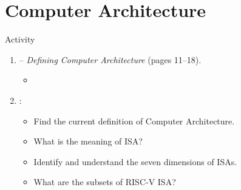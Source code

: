 \section{Computer Architecture}

\begin{frame}[t]{Activity}
\begin{enumerate}
  \item {}  -- 
        \emph{Defining Computer Architecture} (pages 11--18).
    \begin{itemize}
      \item \credithennessy
    \end{itemize}

  \item {}:
    \begin{itemize}
      \item Find the current definition of Computer Architecture.
      \item What is the meaning of ISA?
      \item Identify and understand the seven dimensions of ISAs.
      \item What are the subsets of RISC-V ISA?
    \end{itemize}
\end{enumerate}
\end{frame}
